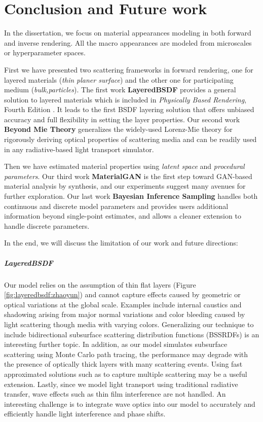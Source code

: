 \chapter{Conclusion and Future work}
\label{cpt:conclusion}

In the dissertation, we focus on material appearances modeling in both forward and inverse rendering. All the macro appearances are modeled from microscales or hyperparameter spaces. 

First we have presented two scattering frameworks in forward rendering, one for layered materials (\emph{thin planer surface}) and the other one for participating medium (\emph{bulk,particles}). The first work \textbf{LayeredBSDF} provides a general solution to layered materials which is included in \emph{Physically Based Rendering}, Fourth Edition \cite{pharr2021physically}. It leads to the first BSDF layering solution that offers unbiased accuracy and full flexibility in setting the layer properties.
Our second work \textbf{Beyond Mie Theory} generalizes the widely-used Lorenz-Mie theory for rigorously deriving optical properties of scattering media and can be readily used in any radiative-based light transport simulator.

Then we have estimated material properties using \emph{latent space} and \emph{procedural parameters}. Our third work \textbf{MaterialGAN} is the first step toward GAN-based material analysis by synthesis, and our experiments suggest many avenues for further exploration. Our last work \textbf{Bayesian Inference Sampling} handles both continuous and discrete model parameters and provides users additional information beyond single-point estimates, and allows a cleaner extension to handle discrete parameters.

In the end, we will discuss the limitation of our work and future directions:

\paragraph{LayeredBSDF}
Our model relies on the assumption of thin flat layers (Figure \ref{fig:layeredbsdf:zhaoyun}) and cannot capture effects caused by geometric or optical variations at the global scale.
Examples include internal caustics and shadowing arising from major normal variations and color bleeding caused by light scattering though media with varying colors.
Generalizing our technique to include bidirectional subsurface scattering distribution functions (BSSRDFs) is an interesting further topic.
In addition, as our model simulates subsurface scattering using Monte Carlo path tracing, the performance may degrade with the presence of optically thick layers with many scattering events.
Using fast approximated solutions such as \cite{jensen2001practical,frisvad2014directional} to capture multiple scattering may be a useful extension.
Lastly, since we model light transport using traditional radiative transfer, wave effects such as thin film interference are not handled.
An interesting challenge is to integrate wave optics into our model to accurately and efficiently handle light interference and phase shifts.

